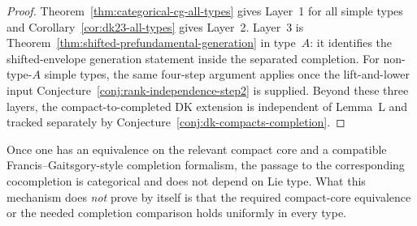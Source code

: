 \begin{proof}
Theorem~\ref{thm:categorical-cg-all-types} gives Layer~1 for all
simple types and Corollary~\ref{cor:dk23-all-types} gives Layer~2.
Layer~3 is Theorem~\ref{thm:shifted-prefundamental-generation} in
type~$A$: it identifies the shifted-envelope generation statement
inside the separated completion. For non-type-$A$ simple types, the
same four-step argument applies once the lift-and-lower input
Conjecture~\ref{conj:rank-independence-step2} is supplied. Beyond
these three layers, the compact-to-completed DK extension is
independent of Lemma~L and tracked separately by
Conjecture~\ref{conj:dk-compacts-completion}.
\end{proof}

\begin{remark}\label{rem:francis-gaitsgory-mc3}
Once one has an equivalence on the relevant compact core and a
compatible Francis--Gaitsgory-style completion formalism, the passage
to the corresponding cocompletion is categorical and does not depend
on Lie type. What this mechanism does \emph{not} prove by itself is
that the required compact-core equivalence or the needed completion
comparison holds uniformly in every type.
\end{remark}

